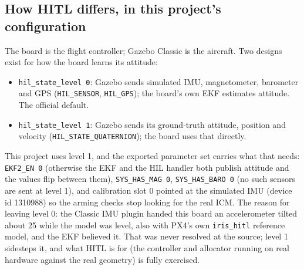 \documentclass[11pt,a4paper]{article}
\newcommand{\file}[1]{\texttt{#1}}
\newcommand{\param}[1]{\texttt{#1}}
\begin{document}
\subsection{How HITL differs, in this project's configuration}
The board is the flight controller; Gazebo Classic is the aircraft. Two designs exist for how the
board learns its attitude:
\begin{itemize}
  \item \param{hil\_state\_level 0}: Gazebo sends simulated IMU, magnetometer, barometer and GPS
        (\texttt{HIL\_SENSOR}, \texttt{HIL\_GPS}); the board's own EKF estimates attitude. The
        official default.
  \item \param{hil\_state\_level 1}: Gazebo sends its ground-truth attitude, position and velocity
        (\texttt{HIL\_STATE\_QUATERNION}); the board uses that directly.
\end{itemize}
This project uses level 1, and the exported parameter set carries what that needs:
\param{EKF2\_EN 0} (otherwise the EKF and the HIL handler both publish attitude and the values
flip between them), \param{SYS\_HAS\_MAG 0}, \param{SYS\_HAS\_BARO 0} (no such sensors are sent
at level 1), and calibration slot 0 pointed at the simulated IMU (device id 1310988) so the
arming checks stop looking for the real ICM. The reason for leaving level 0: the Classic IMU
plugin handed this board an accelerometer tilted about 25\textdegree{} while the model was
level, also with PX4's own \file{iris\_hitl} reference model, and the EKF believed it. That was
never resolved at the source; level 1 sidesteps it, and what HITL is for (the controller and
allocator running on real hardware against the real geometry) is fully exercised.
\end{document}
